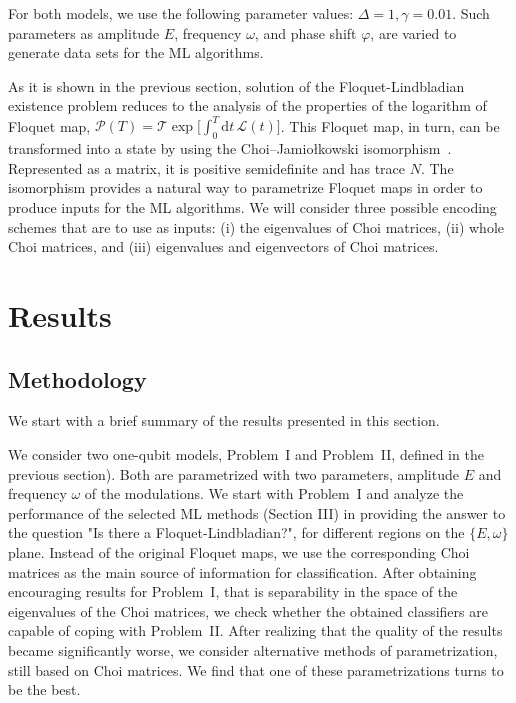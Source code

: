 \documentclass[%
 aip,
 floatfix,
 amsmath,amssymb,
 reprint,%
]{revtex4-1}
\newcommand{\rd}{\mathrm{d}}
\begin{document}
For both models, we use the following parameter values: $\Delta = 1, \gamma = 0.01$. Such parameters as amplitude $E$, frequency $\omega$, and phase shift $\varphi$, are varied to generate data sets for the ML algorithms.

As it is shown in the previous section, solution  of the Floquet-Lindbladian existence problem reduces to the analysis of the properties of the logarithm of Floquet map, $\mathcal{P}(T)=\mathcal{T}\exp\bigg[\int_0^T\!\rd t\, \mathcal{L}(t) \bigg]$. This Floquet map, in turn, can be transformed  into a state by using the Choi–Jamio\l{}kowski isomorphism~\cite{choi,duala}. Represented as a matrix, it is positive semidefinite and has trace $N$. %
The isomorphism provides a natural way to parametrize Floquet maps in order to produce inputs for the ML algorithms. We will consider three possible encoding schemes that are to use as inputs: (i) the eigenvalues of Choi matrices, (ii) whole Choi matrices, and (iii) eigenvalues and eigenvectors of Choi matrices.  


\section{Results\label{sec:5}}
\subsection{Methodology}

We start with a brief summary of the results presented in this section.

We consider two one-qubit models, Problem~I and Problem~II, defined in the previous section).
Both are parametrized with two parameters, amplitude $E$ and  frequency $\omega$ of the modulations.
We start with Problem~I and analyze the performance of the selected  ML methods (Section III) in providing the answer to the question "Is there a Floquet-Lindbladian?", for different regions on the $\lbrace E,\omega \rbrace$ plane. Instead of the original Floquet maps, we use the corresponding Choi matrices as the main source of information for classification. After obtaining  encouraging results for Problem~I, that is separability in the space of the eigenvalues of the Choi matrices, we check  whether the obtained classifiers are capable of coping with Problem~II.
After realizing that the quality of the results became significantly worse, we consider alternative  methods of parametrization, still based on Choi matrices. We find that one of these parametrizations turns to be the best.
\end{document}

